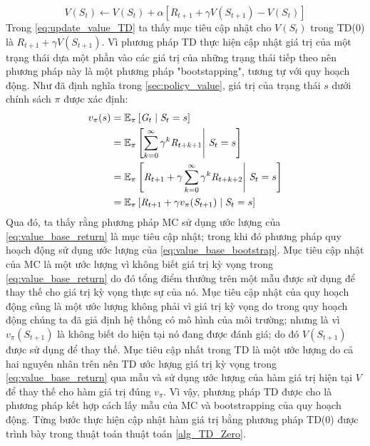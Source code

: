 \begin{equation}
V(\mathit{S}_t) \leftarrow 	V(\mathit{S}_t) + \alpha[\mathit{R}_{t+1} + \gamma V(\mathit{S}_{t+1}) - V(\mathit{S}_t)]
\label{eq:update_value_TD}
\end{equation}
Trong \ref{eq:update_value_TD} ta thấy mục tiêu cập nhật cho $V(\mathit{S}_t)$ trong TD(0) là $\mathit{R}_{t+1} + \gamma V(\mathit{S}_{t+1})$. Vì phương pháp TD thực hiện cập nhật giá trị của một trạng thái dựa một phần vào các giá trị của những trạng thái tiếp theo nên phương pháp này là một phương pháp "bootstapping", tương tự với quy hoạch động. Như đã định nghĩa trong \ref{sec:policy_value}, giá trị của trạng thái $s$ dưới chính sách $\pi$ được xác định:
\begin{align}
v_{\pi}(s) = {} & \mathbb{E}_{\pi}\left [\mathit{G}_t \mid \mathit{S}_{t} = s\right ] \label{eq:value_base_return} \\
={} & \mathbb{E}_{\pi}\left [\sum_{k = 0}^{\infty}\gamma^{k}\mathit{R}_{t+k+1} \middle|\ \mathit{S}_t= s\right ] \notag \\
= {} & \mathbb{E}_{\pi}\left [\mathit{R}_{t+1} + \gamma \sum_{k = 0}^{\infty}\gamma^{k}\mathit{R}_{t+k+2} \middle|\ \mathit{S}_t= s\right ] \notag \\
= {} & \mathbb{E}_{\pi} \left[\mathit{R}_{t+1} + \gamma v_{\pi}(\mathit{S}_{t+1}) \mid \mathit{S}_t = s\right] \label{eq:value_base_bootstrap}
\end{align}
Qua đó, ta thấy rằng phương pháp MC sử dụng ước lượng của \ref{eq:value_base_return} là mục tiêu cập nhật; trong khi đó phương pháp quy hoạch động sử dụng ước lượng của \ref{eq:value_base_bootstrap}. Mục tiêu cập nhật của MC là một ước lượng vì không biết giá trị kỳ vọng trong \ref{eq:value_base_return} do đó tổng điểm thưởng trên một mẫu được sử dụng để thay thế cho giá trị kỳ vọng thực sự của nó. Mục tiêu cập nhật của quy hoạch động cũng là một ước lượng không phải vì giá trị kỳ vọng do trong quy hoạch động chúng ta đã giả định hệ thống có mô hình của môi trường; nhưng là vì $v_{\pi}(\mathit{S}_{t+1})$ là không biết do hiện tại nó đang được đánh giá; do đó $V(\mathit{S}_{t+1})$ được sử dụng để thay thế. Mục tiêu cập nhất trong TD là một ước lượng do cả hai nguyên nhân trên nên TD ước lượng giá trị kỳ vọng trong \ref{eq:value_base_return} qua mẫu và sử dụng ước lượng của hàm giá trị hiện tại $V$ để thay thế cho hàm giá trị đúng $v_{\pi}$. Vì vậy, phương pháp TD được cho là phương pháp kết hợp cách lấy mẫu của MC và bootstrapping của quy hoạch động. Từng bước thực hiện cập nhật hàm giá trị bằng phương pháp TD(0) được trình bày trong thuật toán thuật toán \ref{alg_TD_Zero}.
